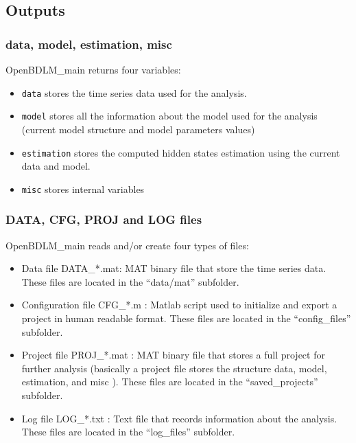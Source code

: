 \documentclass{article}
\begin{document}
\subsection{Outputs}

\subsubsection{data, model, estimation, misc}
OpenBDLM\_main returns four variables:
\begin{itemize}
 \item   \lstinline[basicstyle = \mlttfamily \small]!data! stores the time series data used for the analysis.
 \item  \lstinline[basicstyle = \mlttfamily \small]!model!   stores all the information about the model used for the analysis (current model structure and model parameters values)
 \item   \lstinline[basicstyle = \mlttfamily \small]!estimation!  stores the computed hidden states estimation using the current data and model.
 \item  \lstinline[basicstyle = \mlttfamily \small]!misc! stores internal variables
\end{itemize}

\subsubsection{DATA, CFG, PROJ and LOG files}
OpenBDLM\_main reads and/or create four types of files:

\begin{itemize}
    \item Data file DATA\_*.mat: MAT binary file that store the time series data. These files are located in the ``data/mat'' subfolder.
    \item Configuration file CFG\_*.m : Matlab script used to initialize and export a project in human readable format. These files are located in the ``config\_files'' subfolder.
    \item Project file PROJ\_*.mat : MAT binary file that stores a full project for further analysis (basically a project file stores the structure data, model, estimation, and misc ). These files are located in the ``saved\_projects'' subfolder.
    \item Log file LOG\_*.txt : Text file that records information about the analysis. These files are located in the ``log\_files'' subfolder.
\end{itemize}
\end{document}
